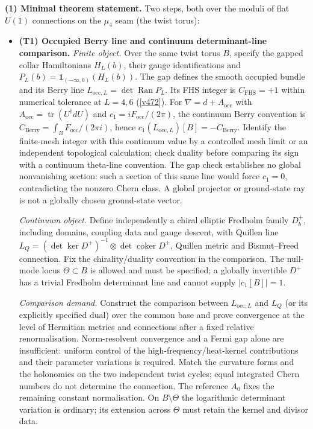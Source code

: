 \documentclass[11pt,a4paper]{article}
\begin{document}
\par\smallskip\noindent\textbf{(1) Minimal theorem statement.} Two steps, both over the moduli
of flat $U(1)$ connections on the $\mu_4$ seam (the twist torus):
\begin{itemize}
\item \textbf{(T1) Occupied Berry line and continuum determinant-line comparison.}
  \emph{Finite object.} Over the same twist torus $B$, specify the gapped collar
  Hamiltonians $H_L(b)$, their gauge identifications and
  $P_L(b)=\mathbf{1}_{(-\infty,0)}(H_L(b))$. The gap defines the smooth occupied
  bundle and its Berry line $L_{\mathrm{occ},L}=\det\operatorname{Ran}P_L$.
  Its FHS integer is $C_{\mathrm{FHS}}=+1$ within numerical tolerance at
  $L=4,6$ (\vref{v472}). For $\nabla=d+A_{\mathrm{occ}}$ with
  $A_{\mathrm{occ}}=\operatorname{tr}(U^\dagger dU)$ and $c_1=iF_{\mathrm{occ}}/(2\pi)$,
  the continuum Berry convention is $C_{\mathrm{Berry}}=\int_B F_{\mathrm{occ}}/(2\pi i)$,
  hence $c_1(L_{\mathrm{occ},L})[B]=-C_{\mathrm{Berry}}$.
  Identify the finite-mesh integer with this continuum value by a controlled
  mesh limit or an independent topological calculation; check duality before
  comparing its sign with a continuum theta-line convention.
  The gap check establishes no global nonvanishing section: such a section of
  this same line would force $c_1=0$, contradicting the nonzero Chern class.
  A global projector or ground-state ray is not a globally chosen ground-state vector.

  \emph{Continuum object.} Define independently a chiral elliptic Fredholm family
  $D_b^+$, including domains, coupling data and gauge descent, with Quillen line
  $L_Q=(\det\ker D^+)^{-1}\otimes\det\operatorname{coker}D^+$, Quillen metric
  and Bismut--Freed connection. Fix the chirality/duality convention in the comparison.
  The null-mode locus $\Theta\subset B$ is allowed and must be specified; a globally
  invertible $D^+$ has a trivial Fredholm determinant line and cannot supply $|c_1[B]|=1$.

  \emph{Comparison demand.} Construct the comparison between $L_{\mathrm{occ},L}$
  and $L_Q$ (or its explicitly specified dual) over the common base and prove
  convergence at the level of Hermitian metrics and connections after a fixed
  relative renormalisation. Norm-resolvent convergence and a Fermi gap alone are
  insufficient: uniform control of the high-frequency/heat-kernel contributions
  and their parameter variations is required. Match the curvature forms and the
  holonomies on the two independent twist cycles; equal integrated Chern numbers
  do not determine the connection. The reference $A_0$ fixes the remaining constant
  normalisation. On $B\setminus\Theta$ the logarithmic determinant variation is
  ordinary; its extension across $\Theta$ must retain the kernel and divisor data.


\end{itemize}
\end{document}
